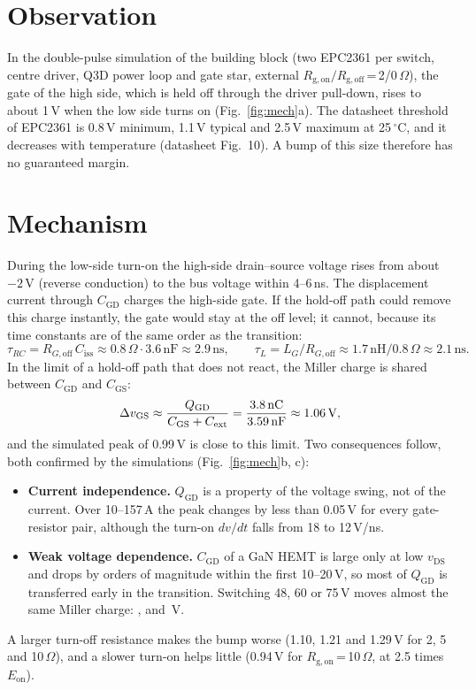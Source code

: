 \documentclass[10pt,a4paper]{article}
\begin{document}
\section{Observation}
In the double-pulse simulation of the building block (two EPC2361 per switch, centre driver, Q3D power loop and gate star, external $R_\mathrm{g,on}/R_\mathrm{g,off}$\,=\,2/0\,$\Omega$), the gate of the high side, which is held off through the driver pull-down, rises to about 1\,V when the low side turns on (Fig.~\ref{fig:mech}a). The datasheet threshold of EPC2361 is 0.8\,V minimum, 1.1\,V typical and 2.5\,V maximum at 25\,$^\circ$C, and it decreases with temperature (datasheet Fig.~10). A bump of this size therefore has no guaranteed margin.

\section{Mechanism}
During the low-side turn-on the high-side drain--source voltage rises from about $-2$\,V (reverse conduction) to the bus voltage within 4--6\,ns. The displacement current through $C_\mathrm{GD}$ charges the high-side gate. If the hold-off path could remove this charge instantly, the gate would stay at the off level; it cannot, because its time constants are of the same order as the transition:
\begin{equation}
\tau_{RC}=R_{G,\mathrm{off}}\,C_\mathrm{iss}\approx0.8\,\Omega\cdot3.6\,\mathrm{nF}\approx2.9\,\mathrm{ns},\qquad
\tau_{L}=L_G/R_{G,\mathrm{off}}\approx1.7\,\mathrm{nH}/0.8\,\Omega\approx2.1\,\mathrm{ns}.
\end{equation}
In the limit of a hold-off path that does not react, the Miller charge is shared between $C_\mathrm{GD}$ and $C_\mathrm{GS}$:
\begin{equation}
\Delta v_\mathrm{GS}\approx\frac{Q_\mathrm{GD}}{C_\mathrm{GS}+C_\mathrm{ext}}=\frac{3.8\,\mathrm{nC}}{3.59\,\mathrm{nF}}\approx1.06\,\mathrm{V},
\label{eq:div}
\end{equation}
and the simulated peak of 0.99\,V is close to this limit. Two consequences follow, both confirmed by the simulations (Fig.~\ref{fig:mech}b, c):
\begin{itemize}
\item \textbf{Current independence.} $Q_\mathrm{GD}$ is a property of the voltage swing, not of the current. Over 10--157\,A the peak changes by less than 0.05\,V for every gate-resistor pair, although the turn-on $dv/dt$ falls from 18 to 12\,V/ns.
\item \textbf{Weak voltage dependence.} $C_\mathrm{GD}$ of a GaN HEMT is large only at low $v_\mathrm{DS}$ and drops by orders of magnitude within the first 10--20\,V, so most of $Q_\mathrm{GD}$ is transferred early in the transition. Switching 48, 60 or 75\,V moves almost the same Miller charge: \BmpFortyEight, \BmpSixty{} and \BmpSeventyFive\,V.
\end{itemize}
A larger turn-off resistance makes the bump worse (1.10, 1.21 and 1.29\,V for 2, 5 and 10\,$\Omega$), and a slower turn-on helps little (0.94\,V for $R_\mathrm{g,on}$\,=\,10\,$\Omega$, at 2.5 times $E_\mathrm{on}$).
\end{document}
